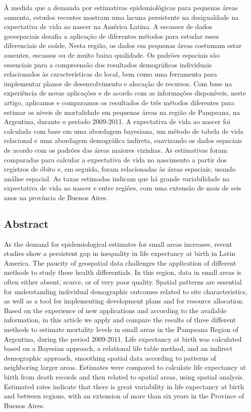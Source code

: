 \documentclass[12pt,]{article}
\begin{document}
À medida que a demanda por estimativas epidemiológicas para pequenas
áreas aumenta, estudos recentes mostram uma lacuna persistente na
desigualdade na expectativa de vida ao nascer na América Latina. A
escassez de dados geoespaciais desafia a aplicação de diferentes métodos
para estudar esses diferenciais de saúde. Nesta região, os dados em
pequenas áreas costumam estar ausentes, escassos ou de muito baixa
qualidade. Os padrões espaciais são essenciais para a compreensão dos
resultados demográficos individuais relacionados às características do
local, bem como uma ferramenta para implementar planos de
desenvolvimento e alocação de recursos. Com base na experiência de novas
aplicações e de acordo com as informações disponíveis, neste artigo,
aplicamos e comparamos os resultados de três métodos diferentes para
estimar os níveis de mortalidade em pequenas áreas na região de
Pampeana, na Argentina, durante o período 2009-2011. A expectativa de
vida ao nascer foi calculada com base em uma abordagem bayesiana, um
método de tabela de vida relacional e uma abordagem demográfica
indireta, suavizando os dados espaciais de acordo com os padrões das
áreas maiores vizinhas. As estimativas foram comparadas para calcular a
expectativa de vida no nascimento a partir dos registros de óbito e, em
seguida, foram relacionadas às áreas espaciais, usando análise espacial.
As taxas estimadas indicam que há grande variabilidade na expectativa de
vida ao nascer e entre regiões, com uma extensão de mais de seis anos na
província de Buenos Aires.

\hypertarget{abstract}{%
\subsection{Abstract}\label{abstract}}

As the demand for epidemiological estimates for small areas increases,
recent studies show a persistent gap in inequality in life expectancy at
birth in Latin America. The paucity of geospatial data challenges the
application of different methods to study these health differentials. In
this region, data in small areas is often either absent, scarce, or of
very poor quality. Spatial patterns are essential for understanding
individual demographic outcomes related to site characteristics, as well
as a tool for implementing development plans and for resource
allocation. Based on the experience of new applications and according to
the available information, in this article we apply and compare the
results of three different methods to estimate mortality levels in small
areas in the Pampeana Region of Argentina, during the period 2009-2011.
Life expectancy at birth was calculated based on a Bayesian approach, a
relational life table method, and an indirect demographic approach,
smoothing spatial data according to patterns of neighboring larger
areas. Estimates were compared to calculate life expectancy at birth
from death records and then related to spatial areas, using spatial
analysis. Estimated rates indicate that there is great variability in
life expectancy at birth and between regions, with an extension of more
than six years in the Province of Buenos Aires.
\end{document}
